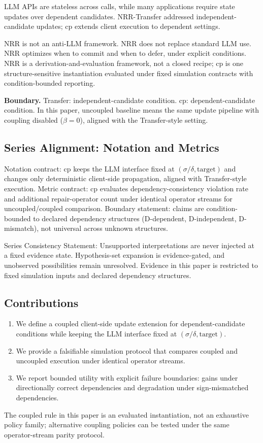 \documentclass[11pt,a4paper]{article}
\begin{document}
LLM APIs are stateless across calls, while many applications require state updates over dependent candidates. NRR-Transfer addressed independent-candidate updates; cp extends client execution to dependent settings.

NRR is not an anti-LLM framework.
NRR does not replace standard LLM use.
NRR optimizes when to commit and when to defer, under explicit conditions.
NRR is a derivation-and-evaluation framework, not a closed recipe; cp is one structure-sensitive instantiation evaluated under fixed simulation contracts with condition-bounded reporting.

\textbf{Boundary.}
Transfer: independent-candidate condition.
cp: dependent-candidate condition.
In this paper, uncoupled baseline means the same update pipeline with coupling disabled (\(\beta=0\)), aligned with the Transfer-style setting\cite{saito2026transfer}.

\subsection{Series Alignment: Notation and Metrics}
Notation contract: cp keeps the LLM interface fixed at \((\sigma/\delta,\text{target})\) and changes only deterministic client-side propagation, aligned with Transfer-style execution.
Metric contract: cp evaluates dependency-consistency violation rate and additional repair-operator count under identical operator streams for uncoupled/coupled comparison.
Boundary statement: claims are condition-bounded to declared dependency structures (D-dependent, D-independent, D-mismatch), not universal across unknown structures.

Series Consistency Statement: Unsupported interpretations are never injected at a fixed evidence state. Hypothesis-set expansion is evidence-gated, and unobserved possibilities remain unresolved. Evidence in this paper is restricted to fixed simulation inputs and declared dependency structures.

\subsection{Contributions}
\begin{enumerate}
  \item We define a coupled client-side update extension for dependent-candidate conditions while keeping the LLM interface fixed at \((\sigma/\delta,\text{target})\).
  \item We provide a falsifiable simulation protocol that compares coupled and uncoupled execution under identical operator streams.
  \item We report bounded utility with explicit failure boundaries: gains under directionally correct dependencies and degradation under sign-mismatched dependencies.
\end{enumerate}
The coupled rule in this paper is an evaluated instantiation, not an exhaustive policy family; alternative coupling policies can be tested under the same operator-stream parity protocol.
\end{document}
